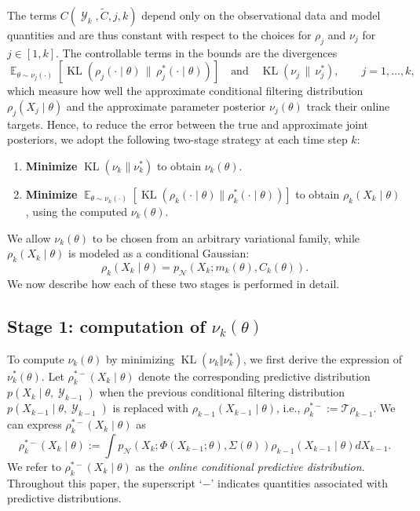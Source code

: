 \documentclass[preprint,3p,times]{elsarticle}
\DeclareMathOperator{\E}{\mathbb{E}}
\DeclareMathOperator{\Y}{\mathcal{Y}}
\DeclareMathOperator{\KL}{KL}
\newcommand{\pdense}{p}
\begin{document}
The terms $C(\Y_k,\tilde{C},j,k)$ depend only on the observational data and model quantities and are thus constant with respect to the choices for $\rho_j$ and $\nu_j$ for $j \in [1,k]$. The controllable terms in the bounds are the divergences
\[
\E_{\theta \sim \nu_j(\cdot)}\!\left[\KL\!\left(\rho_j(\cdot \mid \theta)\,\big\|\, \rho_j^*(\cdot \mid \theta)\right)\right]
\quad \text{and} \quad
\KL\!\left(\nu_j \,\big\|\, \nu_j^*\right), \qquad j=1,\dots,k,
\]
which measure how well the approximate conditional filtering distribution $\rho_j(X_j \mid \theta)$ and the approximate parameter posterior $\nu_j(\theta)$ track their online targets. Hence, to reduce the error between the true and approximate joint posteriors, we adopt the following two-stage strategy at each time step $k$:
\begin{enumerate}
    \item \textbf{Minimize} \( \KL(\nu_k  \| \nu_k^*) \) to obtain \( \nu_k(\theta) \).
    \item \textbf{Minimize} \( \E_{\theta \sim \nu_k(\cdot)}[\KL(\rho_k(\cdot \mid \theta) \| \rho_k^*(\cdot\mid \theta))] \) to obtain \( \rho_k(X_k \mid \theta) \), using the computed \( \nu_k(\theta) \).
\end{enumerate}
We allow \( \nu_k(\theta) \) to be chosen from an arbitrary variational family, while \( \rho_k(X_k \mid \theta) \) is modeled as a conditional Gaussian:
\[
\rho_k(X_k \mid \theta) = \pdense_{\mathcal{N}}(X_k; m_k(\theta), C_k(\theta)).
\]
We now describe how each of these two stages is performed in detail.

\subsection{Stage 1: computation of $\nu_k(\theta)$}
\label{sec:step1}
To compute $\nu_k(\theta)$ by minimizing $\KL(\nu_k \Vert \nu_k^*)$, we first derive the expression of $\nu_k^*(\theta)$. 
%
Let $\rho_k^{*-}(X_k \mid \theta)$ denote the corresponding predictive distribution $p(X_k \mid \theta, \Y_{k-1})$ when the previous conditional filtering distribution $\pdense(X_{k-1} \mid \theta, \Y_{k-1})$ is replaced with $\rho_{k-1}(X_{k-1} \mid \theta)$, i.e., $\rho_k^{*-}:=\mathcal{T}\rho_{k-1}$. We can express $\rho_k^{*-}(X_k \mid \theta)$ as 
\begin{equation*} \rho_k^{*-}(X_k \mid \theta) := \int \pdense_{\mathcal{N}}(X_k; \Phi(X_{k-1};\theta), \Sigma(\theta))\rho_{k-1}(X_{k-1} \mid \theta)dX_{k-1}. \end{equation*} 
We refer to $\rho_k^{*-}(X_k \mid \theta)$ as the \emph{online conditional predictive distribution}. Throughout this paper, the superscript ‘$-$’ indicates quantities associated with predictive distributions.
\end{document}
